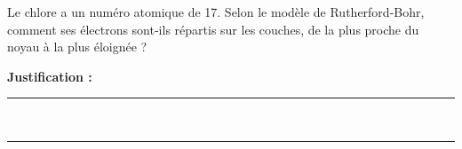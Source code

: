 Le chlore a un numéro atomique de \num{17}. Selon le modèle de Rutherford-Bohr, comment ses électrons sont-ils répartis sur les couches, de la plus proche du noyau à la plus éloignée ?

\choices

\noindent\textbf{Justification :} \hrulefill \\[2.5ex]
\rule{\linewidth}{0.4pt} \\[2.5ex]
\rule{\linewidth}{0.4pt}
\vfill
